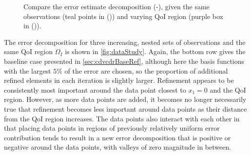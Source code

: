 \begin{figure}[htbp]
\centering
{}
  \caption{Compare the error estimate decomposition (\protect{}-\protect{}), given the same observations (teal points in (\protect{})) and varying QoI region (purple box in (\protect{})).}
  \label{fig:qoiStudy}
\end{figure}

The error decomposition for three increasing, nested sets of observations and the same QoI region $\Omega_I$ is shown in \cref{fig:dataStudy}. Again, the bottom row gives the baseline case presented in \cref{sec:cdvcdrBaseRef}, although here the basis functions with the largest $5\%$ of the error are chosen, so the proportion of additional refined elements in each iteration is slightly larger. Refinement appears to be consistently most important around the data point closest to $x_1=0$ and the QoI region. However, as more data points are added, it becomes no longer necessarily true that refinement becomes less important around data points as their distance from the QoI region increases. The data points also interact with each other in that placing data points in regions of previously relatively uniform error contribution tends to result in a new error decomposition that is positive or negative around the data points, with valleys of zero magnitude in between.

